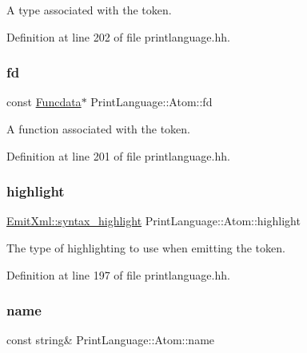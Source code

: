 A type associated with the token. 



Definition at line 202 of file printlanguage.\+hh.

\mbox{\label{struct_print_language_1_1_atom_ae49c0974aa418e7f84d9ce686ddf7198}} 
\subsubsection{\texorpdfstring{fd}{fd}}
{\footnotesize\ttfamily const \mbox{\hyperlink{class_funcdata}{Funcdata}}$\ast$ Print\+Language\+::\+Atom\+::fd}



A function associated with the token. 



Definition at line 201 of file printlanguage.\+hh.

\mbox{\label{struct_print_language_1_1_atom_a10935ca44f3a8ba38874d4d8fd052106}} 
\subsubsection{\texorpdfstring{highlight}{highlight}}
{\footnotesize\ttfamily \mbox{\hyperlink{class_emit_xml_a7c3577436da429c3c75f4b82cac6864f}{Emit\+Xml\+::syntax\+\_\+highlight}} Print\+Language\+::\+Atom\+::highlight}



The type of highlighting to use when emitting the token. 



Definition at line 197 of file printlanguage.\+hh.

\mbox{\label{struct_print_language_1_1_atom_a1956638b6944bf2c4ad7e4a0dc60a64c}} 
\subsubsection{\texorpdfstring{name}{name}}
{\footnotesize\ttfamily const string\& Print\+Language\+::\+Atom\+::name}



